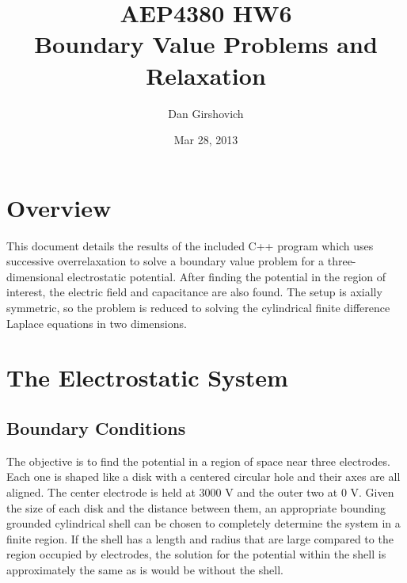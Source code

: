 \documentclass[12pt]{article}
\title{AEP4380 HW6 \\ Boundary Value Problems and Relaxation}
\author{Dan Girshovich}
\date{Mar 28, 2013}
\begin{document}
\maketitle
\section{Overview}
This document details the results of the included C++ program which uses successive overrelaxation to solve a boundary value problem for a three-dimensional electrostatic potential. After finding the potential in the region of interest, the electric field and capacitance are also found. The setup is axially symmetric, so the problem is reduced to solving the cylindrical finite difference Laplace equations in two dimensions.
\section{The Electrostatic System}
\subsection{Boundary Conditions}
The objective is to find the potential in a region of space near three electrodes. Each one is shaped like a disk with a centered circular hole and their axes are all aligned. The center electrode is held at $3000$ V and the outer two at $0$ V. Given the size of each disk and the distance between them, an appropriate bounding grounded cylindrical shell can be chosen to completely determine the system in a finite region. If the shell has a length and radius that are large compared to the region occupied by electrodes, the solution for the potential within the shell is approximately the same as is would be without the shell.
\end{document}
